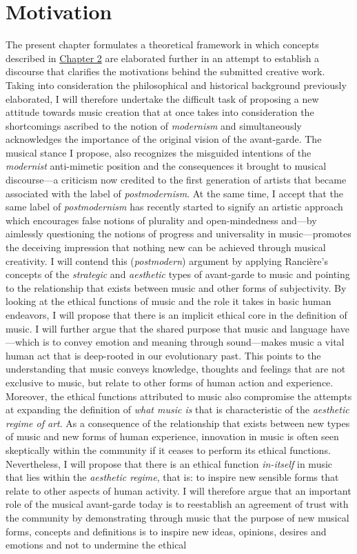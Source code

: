 \hypertarget{chapter3}{}
\chapter{Motivation}

The present chapter formulates a theoretical framework in which concepts described in \hyperlink{chapter2}{Chapter 2} are elaborated further in an attempt to establish a discourse that clarifies the motivations behind the submitted creative work. Taking into consideration the philosophical and historical background previously elaborated, I will therefore undertake the difficult task of proposing a new attitude towards music creation that at once takes into consideration the shortcomings ascribed to the notion of \emph{modernism} and simultaneously acknowledges the importance of the original vision of the avant-garde. The musical stance I propose, also recognizes the misguided intentions of the \emph{modernist} anti-mimetic position and the consequences it brought to musical discourse---a criticism now credited to the first generation of artists that became associated with the label of \emph{postmodernism}. At the same time, I accept that the same label of \emph{postmodernism} has recently started to signify an artistic approach which encourages false notions of plurality and open-mindedness and---by aimlessly questioning the notions of progress and universality in music---promotes the deceiving impression that nothing new can be achieved through musical creativity. I will contend this (\emph{postmodern}) argument by applying Ranci\`{e}re's concepts of the \emph{strategic} and \emph{aesthetic} types of avant-garde to music and pointing to the relationship that exists between music and other forms of subjectivity. By looking at the ethical functions of music and the role it takes in basic human endeavors, I will propose that there is an implicit ethical core in the definition of music. I will further argue that the shared purpose that music and language have---which is to convey emotion and meaning through sound---makes music a vital human act that is deep-rooted in our evolutionary past. This points to the understanding that music conveys knowledge, thoughts and feelings that are not exclusive to music, but relate to other forms of human action and experience. Moreover, the ethical functions attributed to music also compromise the attempts at expanding the definition of \emph{what music is} that is characteristic of the \emph{aesthetic regime of art}. As a consequence of the relationship that exists between new types of music and new forms of human experience, innovation in music is often seen skeptically within the community if it ceases to perform its ethical functions. Nevertheless, I will propose that there is an ethical function \emph{in-itself} in music that lies within the \emph{aesthetic regime}, that is: to inspire new sensible forms that relate to other aspects of human activity. I will therefore argue that an important role of the musical avant-garde today is to reestablish an agreement of trust with the community by demonstrating through music that the purpose of new musical forms, concepts and definitions is to inspire new ideas, opinions, desires and emotions and not to undermine the ethical 